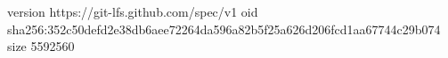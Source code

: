 version https://git-lfs.github.com/spec/v1
oid sha256:352c50defd2e38db6aee72264da596a82b5f25a626d206fcd1aa67744c29b074
size 5592560
